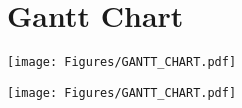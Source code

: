 
\chapter{Gantt Chart} %

\label{AppendixA} %



\begin{figure*}[!ht]
	\centering
	\texttt{[image: Figures/GANTT\_CHART.pdf]}
\end{figure*}
\begin{figure*}
	\centering
	\texttt{[image: Figures/GANTT\_CHART.pdf]}
\end{figure*}
